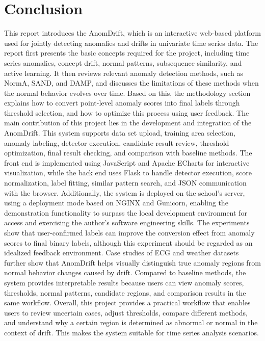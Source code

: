 \chapter{Conclusion}

This report introduces the AnomDrift, which is an interactive web-based platform used for jointly detecting anomalies and drifts in univariate time series data. The report first presents the basic concepts required for the project, including time series anomalies, concept drift, normal patterns, subsequence similarity, and active learning. It then reviews relevant anomaly detection methods, such as NormA, SAND, and DAMP, and discusses the limitations of these methods when the normal behavior evolves over time. Based on this, the methodology section explains how to convert point-level anomaly scores into final labels through threshold selection, and how to optimize this process using user feedback. The main contribution of this project lies in the development and integration of the AnomDrift. This system supports data set upload, training area selection, anomaly labeling, detector execution, candidate result review, threshold optimization, final result checking, and comparison with baseline methods. The front end is implemented using JavaScript and Apache ECharts for interactive visualization, while the back end uses Flask to handle detector execution, score normalization, label fitting, similar pattern search, and JSON communication with the browser. Additionally, the system is deployed on the school's server, using a deployment mode based on NGINX and Gunicorn, enabling the demonstration functionality to surpass the local development environment for access and exercising the author's software engineering skills. The experiments show that user-confirmed labels can improve the conversion effect from anomaly scores to final binary labels, although this experiment should be regarded as an idealized feedback environment. Case studies of ECG and weather datasets further show that AnomDrift helps visually distinguish true anomaly regions from normal behavior changes caused by drift. Compared to baseline methods, the system provides interpretable results because users can view anomaly scores, thresholds, normal patterns, candidate regions, and comparison results in the same workflow. Overall, this project provides a practical workflow that enables users to review uncertain cases, adjust thresholds, compare different methods, and understand why a certain region is determined as abnormal or normal in the context of drift. This makes the system suitable for time series analysis scenarios.



